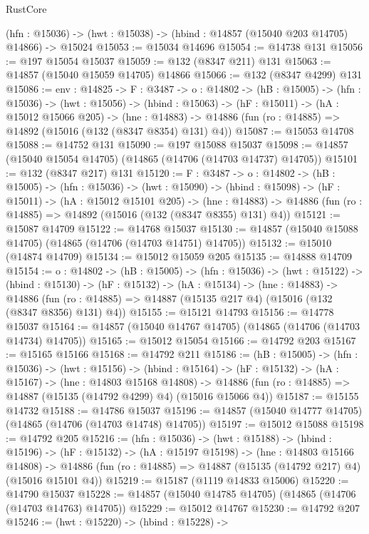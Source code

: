 \begin{lexlean}{RustCore}
\begin{coremodule}
  (hfn : @15036) -> (hwt : @15038) -> (hbind : @14857 (@15040 @203 @14705) @14866) -> @15024
@15053 := @15034 @14696
@15054 := @14738 @131
@15056 := @197 @15054 @15037
@15059 := @132 (@8347 @211) @131
@15063 := @14857 (@15040 @15059 @14705) @14866
@15066 := @132 (@8347 @4299) @131
@15086 := {env : @14825} ->
  {F : @3487} ->
  {o : @14802} ->
  (hB : @15005) ->
  (hfn : @15036) ->
  (hwt : @15056) ->
  (hbind : @15063) ->
  (hF : @15011) ->
  (hA : @15012 @15066 @205) ->
  (hne : @14883) -> @14886 (fun (ro : @14885) => @14892 (@15016 (@132 (@8347 @8354) @131) @4))
@15087 := @15053 @14708
@15088 := @14752 @131
@15090 := @197 @15088 @15037
@15098 := @14857 (@15040 @15054 @14705) (@14865 (@14706 (@14703 @14737) @14705))
@15101 := @132 (@8347 @217) @131
@15120 := {F : @3487} ->
  {o : @14802} ->
  (hB : @15005) ->
  (hfn : @15036) ->
  (hwt : @15090) ->
  (hbind : @15098) ->
  (hF : @15011) ->
  (hA : @15012 @15101 @205) ->
  (hne : @14883) -> @14886 (fun (ro : @14885) => @14892 (@15016 (@132 (@8347 @8355) @131) @4))
@15121 := @15087 @14709
@15122 := @14768 @15037
@15130 := @14857 (@15040 @15088 @14705) (@14865 (@14706 (@14703 @14751) @14705))
@15132 := @15010 (@14874 @14709)
@15134 := @15012 @15059 @205
@15135 := @14888 @14709
@15154 := {o : @14802} ->
  (hB : @15005) ->
  (hfn : @15036) ->
  (hwt : @15122) ->
  (hbind : @15130) ->
  (hF : @15132) ->
  (hA : @15134) ->
  (hne : @14883) ->
  @14886 (fun (ro : @14885) => @14887 (@15135 @217 @4) (@15016 (@132 (@8347 @8356) @131) @4))
@15155 := @15121 @14793
@15156 := @14778 @15037
@15164 := @14857 (@15040 @14767 @14705) (@14865 (@14706 (@14703 @14734) @14705))
@15165 := @15012 @15054
@15166 := @14792 @203
@15167 := @15165 @15166
@15168 := @14792 @211
@15186 := (hB : @15005) ->
  (hfn : @15036) ->
  (hwt : @15156) ->
  (hbind : @15164) ->
  (hF : @15132) ->
  (hA : @15167) ->
  (hne : @14803 @15168 @14808) ->
  @14886 (fun (ro : @14885) => @14887 (@15135 (@14792 @4299) @4) (@15016 @15066 @4))
@15187 := @15155 @14732
@15188 := @14786 @15037
@15196 := @14857 (@15040 @14777 @14705) (@14865 (@14706 (@14703 @14748) @14705))
@15197 := @15012 @15088
@15198 := @14792 @205
@15216 := (hfn : @15036) ->
  (hwt : @15188) ->
  (hbind : @15196) ->
  (hF : @15132) ->
  (hA : @15197 @15198) ->
  (hne : @14803 @15166 @14808) ->
  @14886 (fun (ro : @14885) => @14887 (@15135 (@14792 @217) @4) (@15016 @15101 @4))
@15219 := @15187 (@1119 @14833 @15006)
@15220 := @14790 @15037
@15228 := @14857 (@15040 @14785 @14705) (@14865 (@14706 (@14703 @14763) @14705))
@15229 := @15012 @14767
@15230 := @14792 @207
@15246 := (hwt : @15220) ->
  (hbind : @15228) ->

\end{coremodule}
\end{lexlean}
